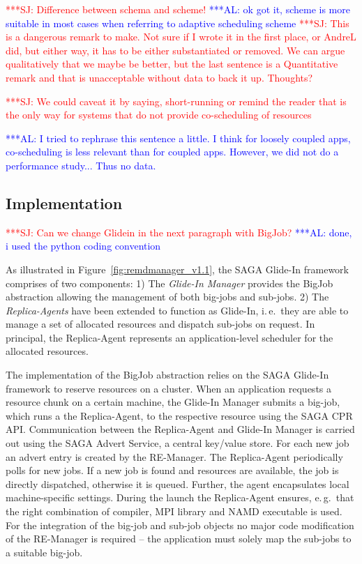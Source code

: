 \documentclass{rspublic}
\newcommand{\alnote}[1]{ {\textcolor{blue} { ***AL: #1 }}}
\newcommand{\jhanote}[1]{ {\textcolor{red} { ***SJ: #1 }}}
\newcommand{\alnote}[1]{}
\newcommand{\jhanote}[1]{}
\newcommand{\replicaagent}[1]{Replica-Agent }
\begin{document}
\jhanote{Difference between schema and scheme!}
\alnote{ok got it, scheme is more suitable in most cases when referring to adaptive
scheduling scheme}
\jhanote{This is a dangerous remark to
  make. Not sure if I wrote it in the first place, or AndreL did, but
  either way, it has to be either substantiated or removed. We can
  argue qualitatively that we maybe be better, but the last sentence
  is a Quantitative remark and that is unacceptable without data to
  back it up. Thoughts?}

\jhanote{We could caveat it by saying, short-running or remind the
  reader that is the only way for systems that do not provide
  co-scheduling of resources}

\alnote{I tried to rephrase this sentence a little. I think for loosely coupled
apps, co-scheduling is less relevant than for coupled apps. However,
we did not do a performance study... Thus no data.}   
         
\subsection{Implementation}
\jhanote{Can we change Glidein in the next paragraph with BigJob?}
\alnote{done, i used the python coding convention}    
                   

As illustrated in Figure~\ref{fig:remdmanager_v1.1}, the SAGA Glide-In
framework comprises of two components: 1) The \emph{Glide-In Manager}
provides the BigJob abstraction allowing the management of both
big-jobs and sub-jobs.  2) The \emph{Replica-Agents} have been extended
to function as Glide-In, i.\,e.\ they are able to manage a set of
allocated resources and dispatch sub-jobs on request. 
In principal, the Replica-Agent represents an application-level
scheduler for the allocated resources.  
            
The implementation of the BigJob abstraction relies on the SAGA 
Glide-In framework to reserve resources on a cluster.
When an application requests a resource chunk on a certain machine, 
the Glide-In Manager submits a big-job, which runs a the Replica-Agent, 
to the respective resource using the SAGA CPR API.
Communication between the Replica-Agent and Glide-In
Manager is carried out using the SAGA Advert Service, a central
key/value store. For each new job an advert entry is created by the
RE-Manager. The \replicaagent\ periodically polls for new jobs.  If a
new job is found and resources are available, the job is directly dispatched,
otherwise it is queued. Further, the agent encapsulates local machine-specific
settings. During the launch the \replicaagent\ ensures, e.\,g.\ 
that the right combination of compiler, MPI library and NAMD 
executable is used.
For the integration of the big-job and sub-job objects
no major code modification of the RE-Manager is required 
-- the application must solely map the sub-jobs to a suitable big-job.
\end{document}
